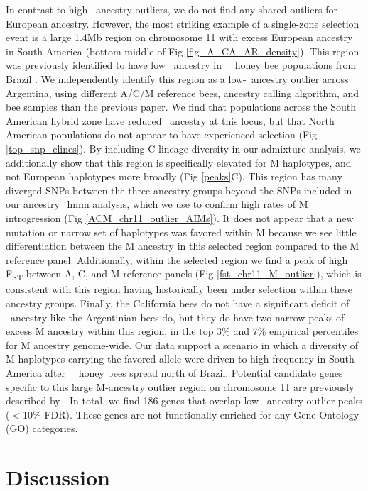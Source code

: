 In contrast to high \A\ ancestry outliers, we do not find any shared outliers for European ancestry. However, the most striking example of a single-zone selection event is a large 1.4Mb region on chromosome 11 with excess European ancestry in South America (bottom middle of Fig \ref{fig_A_CA_AR_density}). This region was previously identified to have low \A\ ancestry in \africanized\ \hyb\ honey bee populations from Brazil \cite{Nelson:2017cj}. We independently identify this region as a low-\A\ ancestry outlier across Argentina, using different A/C/M reference bees, ancestry calling algorithm, and bee samples than the previous paper. We find that populations across the South American hybrid zone have reduced \A\ ancestry at this locus, but that North American populations do not appear to have experienced selection (Fig \ref{top_snp_clines}). By including C-lineage diversity in our admixture analysis, we additionally show that this region is specifically elevated for M haplotypes, and not European haplotypes more broadly (Fig \ref{peaks}C). This region has many diverged SNPs between the three ancestry groups beyond the SNPs included in our ancestry\_hmm analysis, which we use to confirm high rates of M introgression (Fig \ref{ACM_chr11_outlier_AIMs}). It does not appear that a new mutation or narrow set of haplotypes was favored within M because we see little differentiation between the M ancestry in this selected region compared to the M reference panel. Additionally, within the selected region we find a peak of high F\textsubscript{ST} between A, C, and M reference panels (Fig \ref{fst_chr11_M_outlier}), which is consistent with this region having historically been under selection within these ancestry groups. Finally, the California bees do not have a significant deficit of \A\ ancestry like the Argentinian bees do, but they do have two narrow peaks of excess M ancestry within this region, in the top 3\% and 7\% empirical percentiles for M ancestry genome-wide. Our data support a scenario in which a diversity of M haplotypes carrying the favored allele were driven to high frequency in South America after \africanized\ \hyb\ honey bees spread north of Brazil. Potential candidate genes specific to this large M-ancestry outlier region on chromosome 11 are previously described by \cite{Nelson:2017cj}. In total, we find 186 genes that overlap low-\A\ ancestry outlier peaks ($<$10\% FDR). These genes are not functionally enriched for any Gene Ontology (GO) categories.

\section*{Discussion}

